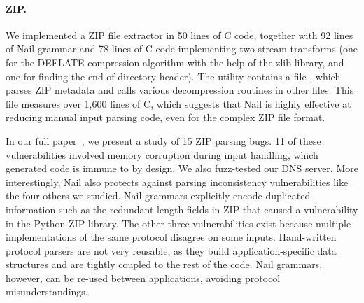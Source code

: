 \paragraph{ZIP.}

We implemented a ZIP file extractor in 50 lines of C code, together with
92 lines of Nail grammar and 78 lines of C code implementing two stream
transforms (one for the DEFLATE compression algorithm with the help of
the zlib library, and one for finding the end-of-directory header).
 The  utility contains a file , which parses
ZIP metadata and calls various decompression routines in other files. This
file measures over 1,600 lines of C, which suggests that Nail is highly
effective at reducing manual input parsing code, even for the complex
ZIP file format.

In our full paper~\cite{bangert:nail-osdi14}, we present a study of 15 ZIP parsing bugs.
11 of these vulnerabilities involved memory corruption during input handling, which generated code
is immune to by design. We also fuzz-tested our DNS server.
More interestingly, Nail also protects against parsing inconsistency vulnerabilities like the four others we studied.
Nail grammars explicitly encode duplicated information such as the redundant length fields in ZIP
that caused a vulnerability in the Python ZIP library. The other three vulnerabilities exist
because multiple implementations of the same protocol disagree on some inputs. Hand-written protocol
parsers are not very reusable, as they build application-specific data structures and are tightly
coupled to the rest of the code. Nail grammars, however, can be re-used between applications,
avoiding protocol misunderstandings.



